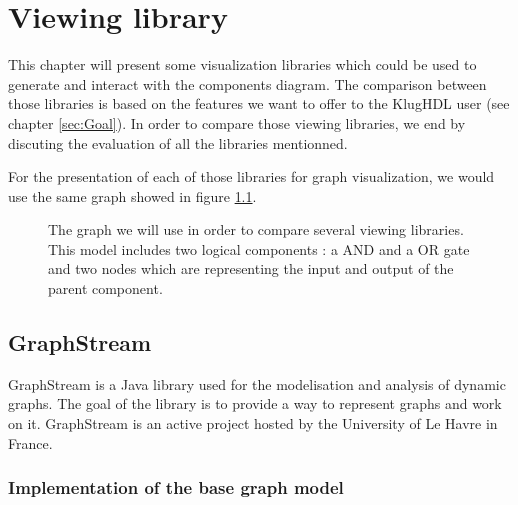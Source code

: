 \chapter{Viewing library}
\label{cha:Viewing library}

This chapter will present some visualization libraries which could be used to
generate and interact with the components diagram. The comparison between those
libraries is based on the features we want to offer to the KlugHDL user (see
chapter \ref{sec:Goal}). In order to compare those viewing libraries, we end by
discuting the evaluation of all the libraries mentionned.

For the presentation of each of those libraries for graph visualization, we would
use the same graph showed in figure \ref{fig:graph-base-model}.

\begin{figure}[H]
  \centering
  \caption[Graph model for the viewing library comparison]{The graph we will use
    in order to compare several viewing libraries. This model includes two
    logical components : a AND and a OR gate and two nodes which are
    representing the input and output of the parent component.}
  \label{fig:graph-base-model}
\end{figure}

\section{GraphStream}
\label{sec:GraphStream}

GraphStream is a Java library used for the modelisation and analysis of dynamic
graphs\cite{graphstream}. The goal of the library is to provide a way to
represent graphs and work on it\cite{graphstream}. GraphStream is an active
project hosted by the University of Le Havre in France.

\subsection{Implementation of the base graph model}
\label{sub:Implementation}

